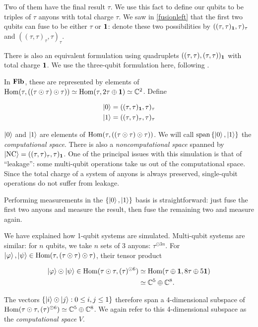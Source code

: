 Two of them have the final result $\tau$. We use this fact to define our qubits
to be triples of $\tau$ anyons with total charge $\tau$. We saw in
\ref{fusionleft} that the first two qubits can fuse to be either $\tau$ or
$\mathbf{1}$: denote these two possibilities by $((\tau,\tau)_{\mathbf{1}},\tau)_\tau$ and
$((\tau,\tau)_\tau,\tau)_\tau$. 

There is also an equivalent formulation using quadruplets
$((\tau,\tau),(\tau,\tau))_{\mathbf{1}}$ with total charge $\mathbf{1}$. We use the
three-qubit formulation here, following \cite{Hormozi2007}.

In $\mathbf{Fib}$, these are represented by elements of $\operatorname{Hom}(\tau, ((\tau \odot
\tau)\odot \tau)) \simeq \operatorname{Hom}(\tau, 2\tau \oplus \mathbf{1}) \simeq \mathbb{C}^2$. 
Define 

\begin{align}
\left|0\right> = ((\tau,\tau)_{\mathbf{1}} , \tau)_\tau \\
\left|1\right> = ((\tau,\tau)_\tau , \tau)_\tau 
\end{align}

$\left|0\right>$ and $\left|1\right>$ are elements of $\operatorname{Hom}(\tau, ((\tau \odot \tau)\odot
\tau))$. We will call $\operatorname{span}\left\{ \left|0\right>, \left|1\right> \right\}$
the \emph{computational space}. There is also a \emph{noncomputational space}
spanned by $\left|\text{NC}\right> = ((\tau,\tau)_\tau,
\tau)_{\mathbf{1}}$. One of the principal issues with this simulation is that of
``leakage'': some multi-qubit operations take us out of the computational space. 
Since the total charge of a system of anyons is always preserved, single-qubit
operations do not suffer from leakage.

Performing measurements in the $\left\{ \left|0\right>, \left|1\right> \right\}$ basis is
straightforward: just fuse the first two anyons and measure the result, then
fuse the remaining two and measure again.

We have explained how 1-qubit systems are simulated. Multi-qubit systems are
similar: for $n$ qubits, we take $n$ sets of $3$ anyons: $\tau^{\odot 3n}$.
For $\left|\varphi\right>,\left|\psi\right>\in \operatorname{Hom}(\tau,(\tau \odot \tau) \odot \tau)$,
their tensor product 

\begin{align*}
\left|\varphi\right> \odot \left|\psi\right> \in \operatorname{Hom}(\tau \odot \tau, (\tau)^{\odot 6})
    &\simeq \operatorname{Hom}(\tau \oplus \mathbf{1}, 8\tau \oplus 5\mathbf{1}) \\&\simeq \mathbb{C}^5
    \oplus \mathbb{C}^8.
\end{align*}

The vectors $\left\{ \left|i\right>\odot \left|j\right> : 0 \leq i,j\leq 1 \right\}$
therefore span a 4-dimensional subspace of $\operatorname{Hom}(\tau \odot \tau, (\tau)^{\odot
6}) \simeq \mathbb{C}^5 \oplus \mathbb{C}^8$. We again refer to this
4-dimensional subspace as the \emph{computational space} $V$. 

